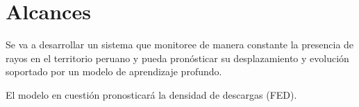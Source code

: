 \section{Alcances}

Se va a desarrollar un sistema que monitoree de manera constante la presencia 
de rayos en el territorio peruano y pueda pronósticar su desplazamiento y 
evolución soportado por un modelo de aprendizaje profundo.

El modelo en cuestión pronosticará la densidad de descargas (FED).


